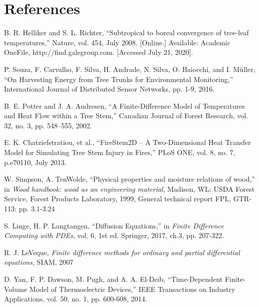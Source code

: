 \documentclass{IEEEtran} %
\begin{document}
\section*{References}
\begin{enumerate}[label={[\arabic*]}]

\item B. R. Helliker and S. L. Richter, “Subtropical to boreal convergence of tree-leaf temperatures,” Nature, vol. 454, July 2008. [Online.] Available: Academic OneFile, http://find.galegroup.com. [Accessed July 21, 2020]. \label{treeleaf}

\item P. Souza, F. Carvalho, F. Silva, H. Andrade, N. Silva, O. Baiocchi, and I. Müller, “On Harvesting Energy from Tree Trunks for Environmental Monitoring,” International Journal of Distributed Sensor Networks, pp. 1-9, 2016. \label{souza}

\item B. E. Potter and J. A. Andresen, “A Finite-Difference Model of Temperatures and Heat Flow within a Tree Stem,” Canadian Journal of Forest Research, vol. 32, no. 3, pp. 548–555, 2002.\label{potter_andresen}

\item  E. K. Chatziefstratiou, et al., “FireStem2D – A Two-Dimensional Heat Transfer Model for Simulating Tree Stem Injury in Fires,” PLoS ONE, vol. 8, no. 7, p.e70110, July 2013.\label{firestem2d}

\item W. Simpson, A. TenWolde, “Physical properties and moisture relations of wood,” in \textit{ Wood handbook: wood as an engineering material}, Madison, WL: USDA Forest Service, Forest Products Laboratory, 1999, General technical report FPL, GTR-113: pp. 3.1-3.24\label{parameter} 

\item S. Linge, H. P. Langtangen, “Diffusion Equations,” in \textit{Finite Difference Computing with PDEs}, vol. 6, 1st ed. Springer, 2017, ch.3, pp. 207-322.\label{2017book}

\item R. J. LeVeque, \textit{ Finite difference methods for ordinary and partial differential equations}, SIAM, 2007\label{leveque} 

\item D. Yan, F. P. Dawson, M. Pugh, and A. A. El-Deib, “Time-Dependent Finite-Volume Model of Thermoelectric Devices,” IEEE Transactions on Industry Applications, vol. 50, no. 1, pp. 600-608, 2014.\label{thermoelectric}


\end{enumerate}
\end{document}
